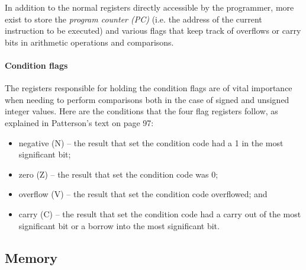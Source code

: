 In addition to the normal registers directly accessible by the programmer, more exist to store the \emph{program counter (PC)} (i.e. the address of the current instruction to be executed) and various flags that keep track of overflows or carry bits in arithmetic operations and comparisons.
\paragraph{Condition flags}
The registers responsible for holding the condition flags are of vital importance when needing to perform comparisons both in the case of signed and unsigned integer values. Here are the conditions that the four flag registers follow, as explained in Patterson's text \cite{patterson2016computer} on page 97:
\begin{itemize}
    \item negative (N) – the result that set the condition code had a 1 in the most
significant bit;
\item zero (Z) – the result that set the condition code was 0;
\item overflow (V) – the result that set the condition code overflowed; and
\item carry (C) – the result that set the condition code had a carry out of the most
significant bit or a borrow into the most significant bit.
\end{itemize}

\subsection{Memory}
